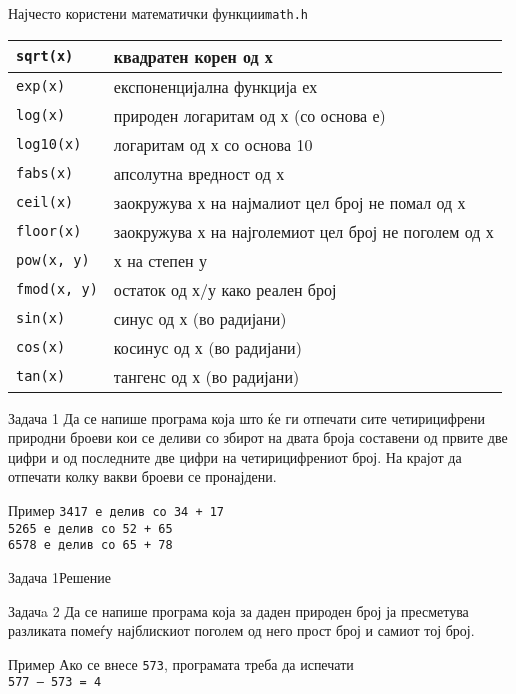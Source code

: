 \begin{frame}{Најчесто користени математички функции}{\texttt{math.h}}
\begin{tabular}{l | l}
\texttt{sqrt(x)} &  квадратен корен од х\\
\hline
\texttt{exp(x)} & експоненцијална функција  ех\\
\hline
\texttt{log(x)} & природен логаритам од х (со основа е)\\
\hline
\texttt{log10(x)} & логаритам од х со основа 10 \\
\hline
\texttt{fabs(x)} & апсолутна вредност од х\\
\hline
\texttt{ceil(x)} & заокружува х на најмалиот цел број не помал од х\\
\hline
\texttt{floor(x)} & заокружува х на најголемиот цел број не поголем од х\\
\hline
\texttt{pow(x, y)}  & х на степен у\\
\hline
\texttt{fmod(x, y)}  & остаток од х/у како реален број\\
\hline
\texttt{sin(x)} & синус од х (во радијани) \\
\hline
\texttt{cos(x)} & косинус од х (во радијани)\\
\hline
\texttt{tan(x)} & тангенс од х (во радијани)
\end{tabular}

\end{frame}

\begin{frame}{Задача 1}
Да се напише програма која што ќе ги отпечати сите четирицифрени природни броеви
кои се деливи со збирот на двата броја составени од првите две цифри и од
последните две цифри на четирицифрениот број. На крајот да отпечати колку вакви
броеви се пронајдени.
\begin{exampleblock}{Пример}
\texttt{3417 е делив со 34 + 17}\\
\texttt{5265 е делив со 52 + 65}\\
\texttt{6578 е делив со 65 + 78}
\end{exampleblock}
\end{frame}

\begin{frame}[fragile]{Задача 1}{Решение}

\end{frame}


\begin{frame}{Задачa 2}
Да се напише програма која за даден природен број ја пресметува разликата помеѓу најблискиот поголем од него прост број и самиот тој број.
\begin{exampleblock}{Пример}
Ако се внесе \texttt{573}, програмата треба да испечати\\
\texttt{577 – 573 = 4}
\end{exampleblock}
\end{frame}

